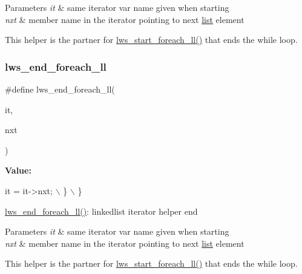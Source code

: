 \begin{DoxyParams}{Parameters}
{\em it} & same iterator var name given when starting \\
\hline
{\em nxt} & member name in the iterator pointing to next \hyperlink{protocollist-p}{list} element\\
\hline
\end{DoxyParams}
This helper is the partner for \hyperlink{group__misc_ga9f138b98c73782807d88e76c1c532dc2}{lws\+\_\+start\+\_\+foreach\+\_\+ll()} that ends the while loop. \mbox{\label{group__misc_ga9d94995ca7a1be16bf3d7bd2e449c812}} 
\subsubsection{\texorpdfstring{lws\+\_\+end\+\_\+foreach\+\_\+ll}{lws\_end\_foreach\_ll}\hspace{0.1cm}{\footnotesize\ttfamily [5/6]}}
{\footnotesize\ttfamily \#define lws\+\_\+end\+\_\+foreach\+\_\+ll(\begin{DoxyParamCaption}\item[{}]{it,  }\item[{}]{nxt }\end{DoxyParamCaption})}

{\bfseries Value\+:}
\begin{DoxyCode}
it = it->nxt; \(\backslash\)
    \} \(\backslash\)
\}
\end{DoxyCode}
\hyperlink{group__misc_ga9d94995ca7a1be16bf3d7bd2e449c812}{lws\+\_\+end\+\_\+foreach\+\_\+ll()}\+: linkedlist iterator helper end


\begin{DoxyParams}{Parameters}
{\em it} & same iterator var name given when starting \\
\hline
{\em nxt} & member name in the iterator pointing to next \hyperlink{protocollist-p}{list} element\\
\hline
\end{DoxyParams}
This helper is the partner for \hyperlink{group__misc_ga9f138b98c73782807d88e76c1c532dc2}{lws\+\_\+start\+\_\+foreach\+\_\+ll()} that ends the while loop. \mbox{\label{group__misc_ga9d94995ca7a1be16bf3d7bd2e449c812}} 
